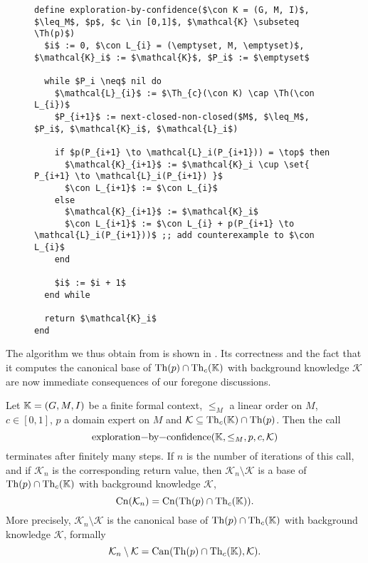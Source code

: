 \begin{figure}[tp]
  \centering
  \begin{Algorithm}
    \label{alg:exploration-by-confidence-first-version}
    \hspace*{0cm}
\begin{lstlisting}
define exploration-by-confidence($\con K = (G, M, I)$, $\leq_M$, $p$, $c \in [0,1]$, $\mathcal{K} \subseteq \Th(p)$)
  $i$ := 0, $\con L_{i} = (\emptyset, M, \emptyset)$, $\mathcal{K}_i$ := $\mathcal{K}$, $P_i$ := $\emptyset$

  while $P_i \neq$ nil do
    $\mathcal{L}_{i}$ := $\Th_{c}(\con K) \cap \Th(\con L_{i})$
    $P_{i+1}$ := next-closed-non-closed($M$, $\leq_M$, $P_i$, $\mathcal{K}_i$, $\mathcal{L}_i$)

    if $p(P_{i+1} \to \mathcal{L}_i(P_{i+1})) = \top$ then
      $\mathcal{K}_{i+1}$ := $\mathcal{K}_i \cup \set{ P_{i+1} \to \mathcal{L}_i(P_{i+1}) }$
      $\con L_{i+1}$ := $\con L_{i}$
    else
      $\mathcal{K}_{i+1}$ := $\mathcal{K}_i$
      $\con L_{i+1}$ := $\con L_{i} + p(P_{i+1} \to \mathcal{L}_i(P_{i+1}))$ ;; add counterexample to $\con L_{i}$
    end

    $i$ := $i + 1$
  end while

  return $\mathcal{K}_i$  
end
\end{lstlisting}
  \end{Algorithm}
\end{figure}

The algorithm we thus obtain from  is shown in
.  Its correctness and the fact that it
computes the canonical base of $\operatorname{Th}(p) \cap \operatorname{Th}_{c}({\mathbb{K}})$ with background knowledge
$\mathcal{K}$ are now immediate consequences of our foregone discussions.

\begin{Corollary}
  \label{cor:exploration-by-confidence-first-version}
  Let ${\mathbb{K}} = (G, M, I)$ be a finite formal context, $\leq_{M}$ a linear order on $M$,
  $c \in [0,1]$, $p$ a domain expert on $M$ and $\mathcal{K} \subseteq \operatorname{Th}_{c}({\mathbb{K}})
  \cap \operatorname{Th}(p)$.  Then the call
  \begin{equation*}
    \text{\lstinline{exploration-by-confidence}}(\con K, \leq_{M}, p, c, \mathcal{K})
  \end{equation*}
  terminates after finitely many steps.  If $n$ is the number of iterations of this call,
  and if $\mathcal{K}_{n}$ is the corresponding return value, then $\mathcal{K}_{n}
  \setminus \mathcal{K}$ is a base of $\operatorname{Th}(p) \cap \operatorname{Th}_{c}({\mathbb{K}})$ with background
  knowledge $\mathcal{K}$, \ie
  \begin{equation*}
    \operatorname{Cn}(\mathcal{K}_{n}) = \operatorname{Cn}(\operatorname{Th}(p) \cap \operatorname{Th}_{c}({\mathbb{K}})).
  \end{equation*}
  More precisely, $\mathcal{K}_{n} \setminus \mathcal{K}$ is the canonical base of $\operatorname{Th}(p)
  \cap \operatorname{Th}_{c}({\mathbb{K}})$ with background knowledge $\mathcal{K}$, formally
  \begin{equation*}
    \mathcal{K}_{n} \setminus \mathcal{K} = \operatorname{Can}(\operatorname{Th}(p) \cap \operatorname{Th}_{c}({\mathbb{K}}), \mathcal{K}).
  \end{equation*}
\end{Corollary}

